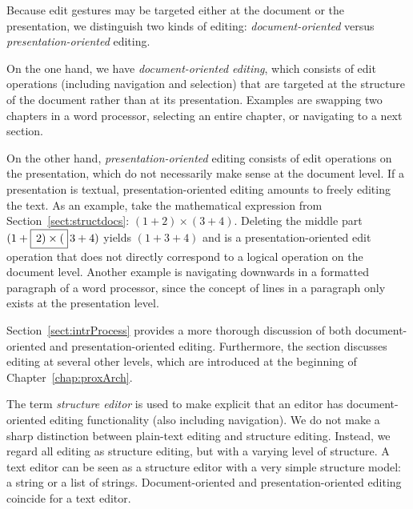 
Because edit gestures may be targeted either at the document or the presentation, we distinguish two kinds of editing:  {\em document-oriented} versus {\em presentation-oriented} editing.


On the one hand, we have {\em document-oriented editing}, which consists of edit operations (including navigation and selection) that are targeted at the structure of the document rather than at its presentation. Examples are swapping two chapters in a word processor, selecting an entire chapter, or navigating to a next section.

On the other hand, {\em presentation-oriented} editing consists of edit operations on the presentation, which do not necessarily make sense at the document level. If a presentation is textual,  presentation-oriented editing amounts to freely editing the text. As an example, take the mathematical expression from Section~\ref{sect:structdocs}: 
$(1+2) \times (3+4)$. Deleting the middle part $(1+\framebox{$\,2) \times ($}\,3+4)$ yields $(1+3+4)$ and is a presentation-oriented edit operation that does not directly correspond to a logical operation on the document level. Another example is navigating downwards in a formatted paragraph of a word processor, since the concept of lines in a paragraph only exists at the presentation level. 

Section~\ref{sect:intrProcess} provides a more thorough discussion of both document-oriented and presentation-oriented editing. Furthermore, the section discusses editing at several other levels, which are introduced at the beginning of Chapter~\ref{chap:proxArch}.


The term {\em structure editor} is used to make explicit that an editor has document-oriented editing functionality (also including navigation). We do not make a sharp distinction between plain-text editing and structure editing. Instead, we regard all editing as structure editing, but with a varying level of structure. A text editor can be seen as a structure editor with a very simple structure model: a string or a list of strings. Document-oriented and presentation-oriented editing coincide for a text editor.

